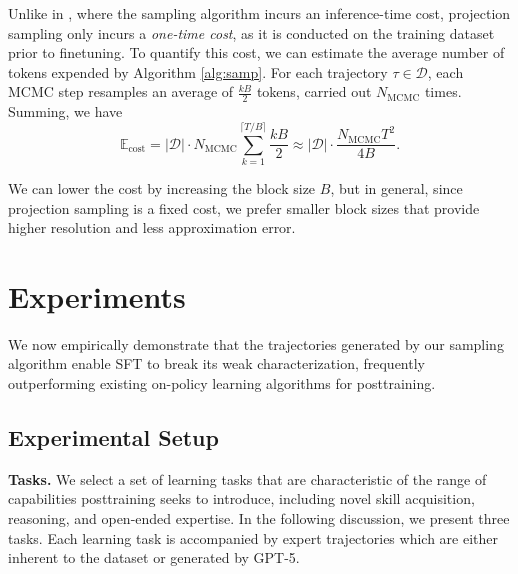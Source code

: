 \documentclass{article}
\renewcommand{\paragraph}[1]{\vspace{.1em}\noindent\textbf{#1}}
\begin{document}
Unlike in \cite{karan2025reasoning}, where the sampling algorithm incurs an inference-time cost, projection sampling only incurs a \textit{one-time cost}, as it is conducted on the training dataset prior to finetuning. To quantify this cost, we can estimate the average number of tokens expended by Algorithm \ref{alg:samp}. For each trajectory $\tau \in \mathcal{D}$, each MCMC step resamples an average of $\frac{kB}{2}$ tokens, carried out $N_{\text{MCMC}}$ times. Summing, we have 
\begin{equation}\label{eq:tok}\mathbb{E}_{\text{cost}} = |\mathcal{D}|\cdot N_{\text{MCMC}}\sum_{k=1}^{\lceil T/B \rceil} \frac{kB}{2} \approx |\mathcal{D}| \cdot \frac{N_{\text{MCMC}}T^2}{4B}.\end{equation}

We can lower the cost by increasing the block size $B$, but in general, since projection sampling is a fixed cost, we prefer smaller block sizes that provide higher resolution and less approximation error.  


\section{Experiments}
\label{headings}

We now empirically demonstrate that the trajectories generated by our sampling algorithm enable SFT to break its weak characterization, frequently outperforming existing on-policy learning algorithms for posttraining.


\subsection{Experimental Setup}


\paragraph{Tasks.} We select a set of learning tasks that are characteristic of the range of capabilities posttraining seeks to introduce, including novel skill acquisition, reasoning, and open-ended expertise. In the following discussion, we present three tasks. Each learning task is accompanied by expert trajectories which are either inherent to the dataset or generated by GPT-5.
\vspace{-8pt}
\end{document}
